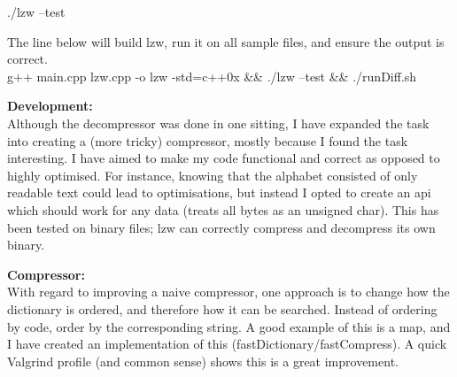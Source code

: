 \documentclass{article}
\begin{document}
./lzw --test

\vspace{\baselineskip} \noindent
The line below will build lzw, run it on all sample files, and ensure the output is correct. \\

g++ main.cpp lzw.cpp  -o lzw -std=c++0x \&\& ./lzw --test \&\& ./runDiff.sh

\vspace{\baselineskip} \noindent
\textbf{Development:} \\
Although the decompressor was done in one sitting, I have expanded the task into creating a (more tricky) compressor, mostly because I found the task interesting. I have aimed to make my code functional and correct as opposed to highly optimised. For instance, knowing that the alphabet consisted of only readable text could lead to optimisations, but instead I opted to create an api which should work for any data (treats all bytes as an unsigned char). This has been tested on binary files; lzw can correctly compress and decompress its own binary.

\vspace{\baselineskip} \noindent
\textbf{Compressor:} \\
With regard to improving a naive compressor, one approach is to change how the dictionary is ordered, and therefore how it can be searched. Instead of ordering by code, order by the corresponding string. A good example of this is a map, and I have created an implementation of this (fastDictionary/fastCompress). A quick Valgrind profile (and common sense) shows this is a great improvement.
\end{document}
